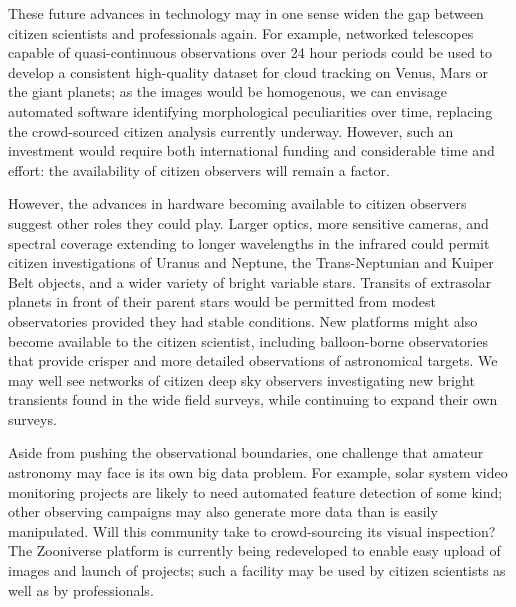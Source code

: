 \documentclass{ar2e}
\begin{document}
These future advances in technology may in one sense widen the gap between
citizen scientists and professionals again. For example, networked telescopes
capable of quasi-continuous observations over 24 hour periods could be used to
develop a consistent high-quality dataset for cloud tracking on Venus, Mars or
the giant planets; as the images would be homogenous, we can envisage automated
software identifying morphological peculiarities over time, replacing the
crowd-sourced citizen analysis currently underway.  However, such an investment
would require both international funding and considerable time and effort: the
availability of citizen observers will remain a factor.




However, the advances in hardware becoming available to citizen observers
suggest other roles they could play. Larger optics, more sensitive cameras, and
spectral coverage extending to longer wavelengths in the infrared could permit
citizen investigations of Uranus and Neptune, the Trans-Neptunian and Kuiper
Belt objects, and a wider variety of bright variable stars.  Transits of
extrasolar planets in front of their parent stars would be permitted from modest
observatories provided they had stable conditions.  New platforms might also
become available to the citizen scientist, including balloon-borne observatories
that provide crisper and more detailed observations of astronomical targets. We
may well see networks of citizen deep sky observers investigating new bright
transients found in the wide field surveys,  while continuing to expand their
own surveys.

Aside from pushing the observational boundaries, one challenge that amateur
astronomy may face is its own big data problem.   For example, solar system
video monitoring projects are likely to need automated feature detection of some
kind; other observing campaigns may also generate more data than is easily
manipulated. Will this community take to crowd-sourcing its visual inspection?
The Zooniverse platform is currently being redeveloped to enable easy upload of images
and launch of projects; such a facility may be used by citizen scientists as well as by 
professionals. 

\end{document}
